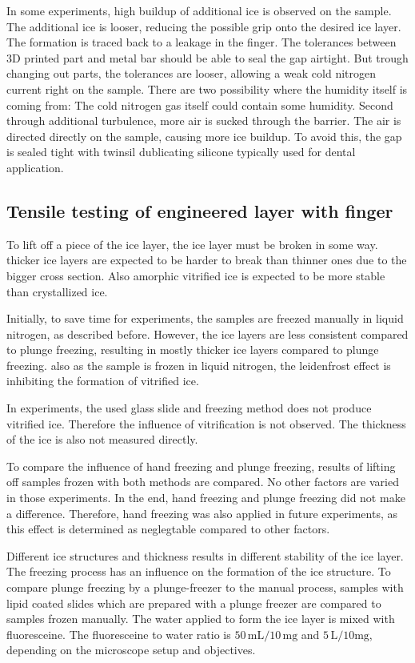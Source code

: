 In some experiments, high buildup of additional ice is observed on the sample. The additional ice is looser, reducing the possible grip onto the desired ice layer. The formation is traced back to a leakage in the finger. The tolerances between 3D printed part and metal bar should be able to seal the gap airtight. But trough changing out parts, the tolerances are looser, allowing a weak cold nitrogen current right on the sample. There are two possibility where the humidity itself is coming from: The cold nitrogen gas itself could contain some humidity. Second through additional turbulence, more air is sucked through the barrier. The air is directed directly on the sample, causing more ice buildup. To avoid this, the gap is sealed tight with twinsil dublicating silicone typically used for dental application.

\subsection{Tensile testing of engineered layer with finger}

To lift off a piece of the ice layer, the ice layer must be broken in some way. thicker ice layers are expected to be harder to break than thinner ones due to the bigger cross section. Also amorphic vitrified ice is expected to be more stable than crystallized ice.

Initially, to save time for experiments, the samples are freezed manually in liquid nitrogen, as described before. However, the ice layers are less consistent compared to plunge freezing, resulting in mostly thicker ice layers compared to plunge freezing. also as the sample is frozen in liquid nitrogen, the leidenfrost effect is inhibiting the formation of vitrified ice.

In experiments, the used glass slide and freezing method does not produce vitrified ice. Therefore the influence of vitrification is not observed. The thickness of the ice is also not measured directly. 

To compare the influence of hand freezing and plunge freezing, results of lifting off samples frozen with both methods are compared. No other factors are varied in those experiments. In the end, hand freezing and plunge freezing did not make a difference. Therefore, hand freezing was also applied in future experiments, as this effect is determined as neglegtable compared to other factors.

Different ice structures and thickness results in different stability of the ice layer. The freezing process has an influence on the formation of the ice structure. To compare plunge freezing by a plunge-freezer to the manual process, samples with lipid coated slides which are prepared with a plunge freezer are compared to samples frozen manually. The water applied to form the ice layer is mixed with fluoresceine. The fluoresceine to water ratio is $50\,\si{\milli\liter}/10\,\si{\milli\gram}$ and $5\,\si{\liter}/10\si{\milli\gram}$, depending on the microscope setup and objectives.

